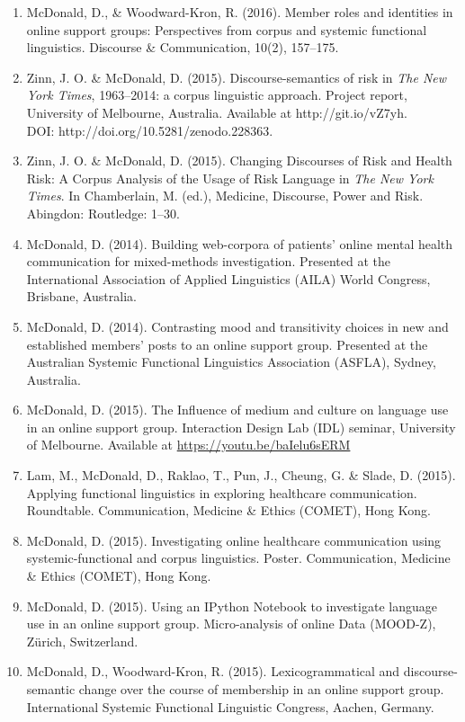 \documentclass[a4paper,10pt,openright,abstract=on]{scrreprt}
\begin{document}
\begin{enumerate}
    \item McDonald, D., \& Woodward-Kron, R. (2016). Member roles and identities in online support groups: Perspectives from corpus and systemic functional linguistics. Discourse \& Communication, 10(2), 157--175.
    \item Zinn, J. O. \& McDonald, D. (2015). Discourse\hyp{}semantics of risk in \emph{The New York Times}, 1963--2014: a corpus linguistic approach. Project report, University of  Melbourne, Australia. Available at http://git.io/vZ7yh. \\ DOI: http://doi.org/10.5281/zenodo.228363.
    \item Zinn, J. O. \& McDonald, D. (2015). Changing Discourses of Risk and Health Risk: A Corpus Analysis of the Usage of Risk Language in \emph{The New York Times}. In Chamberlain, M. (ed.), Medicine, Discourse, Power and Risk. Abingdon: Routledge: 1--30.
    \item McDonald, D. (2014). Building web-corpora of patients' online mental health communication for mixed-methods investigation. Presented at the International Association of Applied Linguistics (AILA) World Congress, Brisbane, Australia.
    \item McDonald, D. (2014). Contrasting mood and transitivity choices in new and established members' posts to an online support group. Presented at the Australian Systemic Functional Linguistics Association (ASFLA), Sydney, Australia.
    \item McDonald, D. (2015). The Influence of medium and culture on language use in an online support group. Interaction Design Lab (IDL) seminar, University of Melbourne. Available at \url{https://youtu.be/baIelu6sERM}
    \item Lam, M., McDonald, D., Raklao, T., Pun, J., Cheung, G. \& Slade, D. (2015). Applying functional linguistics in exploring healthcare communication. Roundtable. Communication, Medicine \& Ethics (COMET), Hong Kong.
    \item McDonald, D. (2015). Investigating online healthcare communication using systemic-functional and corpus linguistics. Poster. Communication, Medicine \& Ethics (COMET), Hong Kong.
    \item McDonald, D. (2015). Using an IPython Notebook to investigate language use in an online support group. Micro-analysis of online Data (MOOD-Z), Z{\"u}rich, Switzerland.
    \item McDonald, D., Woodward-Kron, R. (2015). Lexicogrammatical and discourse\hyp{}semantic change over the course of membership in an online support group. International Systemic Functional Linguistic Congress, Aachen, Germany.

\end{enumerate}
\end{document}
